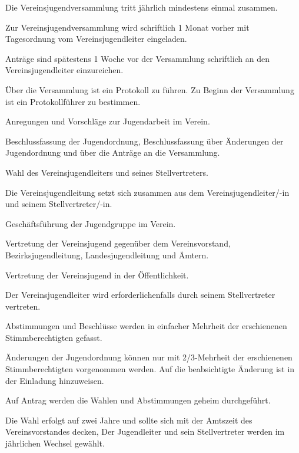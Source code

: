 \documentclass[10pt,a4paper,parskip=half]{scrartcl}
\begin{document}
\begin{contract}
    Die Vereinsjugendversammlung tritt jährlich mindestens einmal zusammen.

    Zur Vereinsjugendversammlung wird schriftlich 1 Monat vorher mit Tagesordnung vom Vereinsjugendleiter eingeladen.

    Anträge sind spätestens 1 Woche vor der Versammlung schriftlich an den Vereinsjugendleiter einzureichen.

    Über die Versammlung ist ein Protokoll zu führen. Zu Beginn der Versammlung ist ein Protokollführer zu bestimmen.

    
    Anregungen und Vorschläge zur Jugendarbeit im Verein.

    Beschlussfassung der Jugendordnung, Beschlussfassung über Änderungen der Jugendordnung und über die Anträge an die Versammlung.

    Wahl des Vereinsjugendleiters und seines Stellvertreters.


    Die Vereinsjugendleitung setzt sich zusammen aus dem Vereinsjugendleiter/-in und seinem Stellvertreter/-in.


    Geschäftsführung der Jugendgruppe im Verein.

    Vertretung der Vereinsjugend gegenüber dem Vereinsvorstand, Bezirksjugendleitung, Landesjugendleitung und Ämtern.

    Vertretung der Vereinsjugend in der Öffentlichkeit.

    Der Vereinsjugendleiter wird erforderlichenfalls durch seinem Stellvertreter vertreten.


    Abstimmungen und Beschlüsse werden in einfacher Mehrheit der erschienenen Stimmberechtigten gefasst.

    Änderungen der Jugendordnung können nur mit 2/3-Mehrheit der erschienenen Stimmberechtigten vorgenommen werden. Auf die beabsichtigte Änderung ist in der Einladung hinzuweisen.

    Auf Antrag werden die Wahlen und Abstimmungen geheim durchgeführt.

    Die Wahl erfolgt auf zwei Jahre und sollte sich mit der Amtszeit des Vereinsvorstandes decken, Der Jugendleiter und sein Stellvertreter werden im jährlichen Wechsel gewählt.


\end{contract}
\end{document}
